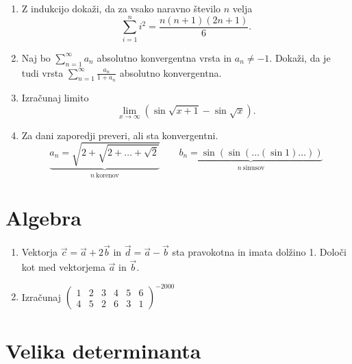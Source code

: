 \documentclass[a4paper,12pt]{article}
\begin{document}
\begin{enumerate}
\item
Z indukcijo dokaži, da za vsako naravno število \(n\) velja
\[
\sum_{i=1}^{n}i^2 = \frac{n(n+1)(2n+1)}{6}. 
\]

\item
Naj bo \(\sum_{n=1}^{\infty} a_n \) absolutno konvergentna vrsta in \(a_n \ne -1\).
Dokaži, da je tudi vrsta \(\sum_{n=1}^\infty \frac{a_n}{1+a_n}\)
absolutno konvergentna.

\item
Izračunaj limito
\[
\lim_{x \to \infty}(\sin \sqrt{x+1} - \sin \sqrt{x}).
\]

\item
Za dani zaporedji preveri, ali sta konvergentni.
\[ \underbrace{a_n = \sqrt{2+\sqrt{2+\dots+\sqrt{2}}}}_{n~ \text{korenov}}  \qquad
\underbrace{b_n = \sin(\sin(\dots(\sin 1)\dots))}_{n~ \text{sinusov}}
\]
\end{enumerate}

\section*{Algebra}

\begin{enumerate}
\item
Vektorja \(\vec{c} = \vec{a} + 2\vec{b}\) in \(\vec{d} = \vec{a} - \vec{b}\)
sta pravokotna in imata dolžino 1. Določi kot med vektorjema \(\vec{a}\) in \(\vec{b}\).

\item
Izračunaj
\(\begin{pmatrix} 
1 & 2 & 3 & 4 & 5 & 6 \\
4 & 5 & 2 & 6 & 3 & 1
\end{pmatrix}^{-2000}\)
\end{enumerate}

\section*{Velika determinanta}
\end{document}
